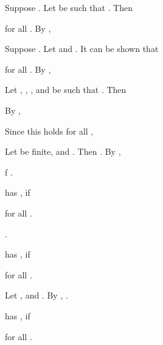 \documentclass[b5paper, english, oneside]{memoir}
\begin{document}
\begin{example}
Suppose . Let  be such that . Then 

for all . By ,

\end{example}

\begin{example}
\label{LogGrowsSlowly}
Suppose . Let  and . It can be shown that

for all . By ,

\end{example}

\begin{example}
\label{LogGrowsSlowlyGeneralized}
Let , , , and  be such that . Then

By , 

Since this holds for all ,

\end{example}

\begin{example}
\label{FunctionsInFiniteSet}
Let  be finite, and . Then . By ,
\begin{eqs}
f \in {}.
\end{eqs}
\end{example}

\begin{definition}
 has , if 
 
for all . 
\end{definition}

\begin{example}
.
\end{example}

\begin{definition}
 has , if

for all .
\end{definition}

\begin{example}
Let , and . By , .
\end{example}

\begin{definition}
 has , if

for all . 
\end{definition}
\end{document}
